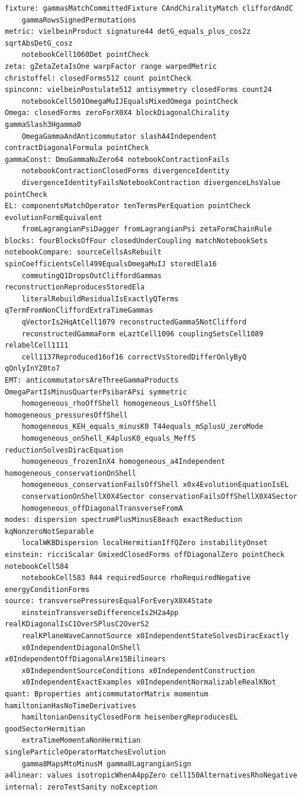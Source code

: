 \documentclass[11pt]{article}
\begin{document}
\begin{Verbatim}[fontsize=\small]
fixture: gammasMatchCommittedFixture CAndChiralityMatch cliffordAndC
    gammaRowsSignedPermutations
metric: vielbeinProduct signature44 detG_equals_plus_cos2z sqrtAbsDetG_cosz
    notebookCell1060Det pointCheck
zeta: gZetaZetaIsOne warpFactor range warpedMetric
christoffel: closedForms512 count pointCheck
spinconn: vielbeinPostulate512 antisymmetry closedForms count24
    notebookCell501OmegaMuIJEqualsMixedOmega pointCheck
Omega: closedForms zeroForX0X4 blockDiagonalChirality gammaSlash3Hgamma0
    OmegaGammaAndAnticommutator slashA4Independent contractDiagonalFormula pointCheck
gammaConst: DmuGammaNuZero64 notebookContractionFails
    notebookContractionClosedForms divergenceIdentity
    divergenceIdentityFailsNotebookContraction divergenceLhsValue pointCheck
EL: componentsMatchOperator tenTermsPerEquation pointCheck evolutionFormEquivalent
    fromLagrangianPsiDagger fromLagrangianPsi zetaFormChainRule
blocks: fourBlocksOfFour closedUnderCoupling matchNotebookSets
notebookCompare: sourceCellsAsRebuilt spinCoefficientsCell499EqualsOmegaMuIJ storedEla16
    commutingQ1DropsOutCliffordGammas reconstructionReproducesStoredEla
    literalRebuildResidualIsExactlyQTerms qTermFromNonCliffordExtraTimeGammas
    qVectorIs2HqAtCell1079 reconstructedGamma5NotClifford
    reconstructedGammaForm eLaztCell1096 couplingSetsCell1089 relabelCell1111
    cell1137Reproduced16of16 correctVsStoredDifferOnlyByQ qOnlyInYZ0to7
EMT: anticommutatorsAreThreeGammaProducts OmegaPartIsMinusQuarterPsibarAPsi symmetric
    homogeneous_rhoOffShell homogeneous_LsOffShell homogeneous_pressuresOffShell
    homogeneous_KEH_equals_minusK0 T44equals_mSplusU_zeroMode
    homogeneous_onShell_K4plusK0_equals_MeffS reductionSolvesDiracEquation
    homogeneous_frozenInX4 homogeneous_a4Independent homogeneous_conservationOnShell
    homogeneous_conservationFailsOffShell x0x4EvolutionEquationIsEL
    conservationOnShellX0X4Sector conservationFailsOffShellX0X4Sector
    homogeneous_offDiagonalTransverseFromA
modes: dispersion spectrumPlusMinusE8each exactReduction kqNonzeroNotSeparable
    localWKBDispersion localHermitianIffQZero instabilityOnset
einstein: ricciScalar GmixedClosedForms offDiagonalZero pointCheck notebookCell584
    notebookCell583 R44 requiredSource rhoRequiredNegative energyConditionForms
source: transversePressuresEqualForEveryX0X4State
    einsteinTransverseDifferenceIs2H2a4pp realKDiagonalIsC1OverSPlusC2OverS2
    realKPlaneWaveCannotSource x0IndependentStateSolvesDiracExactly
    x0IndependentDiagonalOnShell x0IndependentOffDiagonalAre15Bilinears
    x0IndependentSourceConditions x0IndependentConstruction
    x0IndependentExactExamples x0IndependentNormalizableRealKNot
quant: Bproperties anticommutatorMatrix momentum hamiltonianHasNoTimeDerivatives
    hamiltonianDensityClosedForm heisenbergReproducesEL goodSectorHermitian
    extraTimeMomentaNonHermitian singleParticleOperatorMatchesEvolution
    gamma8MapsMtoMinusM gamma8LagrangianSign
a4linear: values isotropicWhenA4ppZero cell150AlternativesRhoNegative
internal: zeroTestSanity noException
\end{Verbatim}
\end{document}
